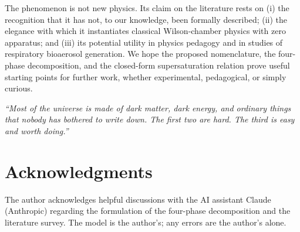 \documentclass[11pt,a4paper]{article}
\theoremstyle{definition}
\theoremstyle{plain}
\begin{document}
The phenomenon is not new physics. Its claim on the literature rests on (i) the recognition that it has not, to our knowledge, been formally described; (ii) the elegance with which it instantiates classical Wilson-chamber physics with zero apparatus; and (iii) its potential utility in physics pedagogy and in studies of respiratory bioaerosol generation. We hope the proposed nomenclature, the four-phase decomposition, and the closed-form supersaturation relation prove useful starting points for further work, whether experimental, pedagogical, or simply curious.

\medskip
\begin{flushright}
\itshape
``Most of the universe is made of dark matter, dark energy, and ordinary things that nobody has bothered to write down. The first two are hard. The third is easy and worth doing.''
\end{flushright}

\section*{Acknowledgments}

The author acknowledges helpful discussions with the AI assistant Claude (Anthropic) regarding the formulation of the four-phase decomposition and the literature survey. The model is the author's; any errors are the author's alone.

\end{document}
